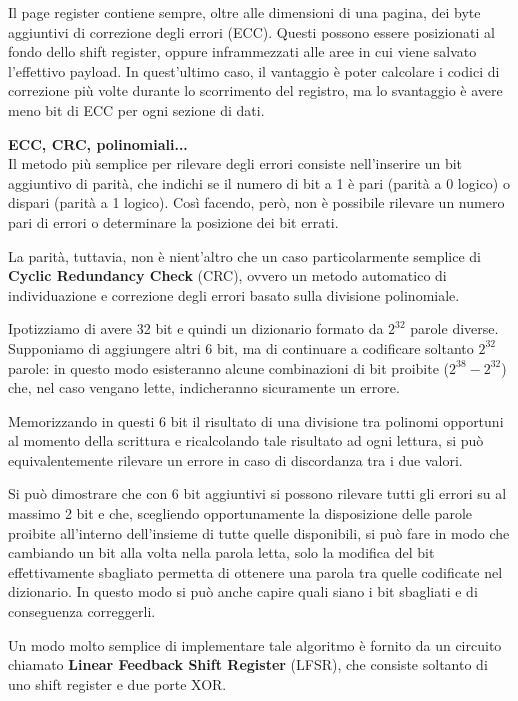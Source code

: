 \documentclass[11pt,4paper]{report}
\begin{document}
Il page register contiene sempre, oltre alle dimensioni di una pagina, dei byte aggiuntivi di correzione degli errori (ECC). Questi possono essere posizionati al fondo dello shift register, oppure inframmezzati alle aree in cui viene salvato l'effettivo payload. In quest'ultimo caso, il vantaggio è poter calcolare i codici di correzione più volte durante lo scorrimento del registro, ma lo svantaggio è avere meno bit di ECC per ogni sezione di dati.
\pagebreak
\begin{tcolorbox}[breakable]
\textbf{ECC, CRC, polinomiali...}\\
Il metodo più semplice per rilevare degli errori consiste nell'inserire un bit aggiuntivo di parità, che indichi se il numero di bit a 1 è pari (parità a 0 logico) o dispari (parità a 1 logico). Così facendo, però, non è possibile rilevare un numero pari di errori o determinare la posizione dei bit errati.

La parità, tuttavia, non è nient'altro che un caso particolarmente semplice di \textbf{Cyclic Redundancy Check} (CRC), ovvero un metodo automatico di individuazione e correzione degli errori basato sulla divisione polinomiale.

Ipotizziamo di avere 32 bit e quindi un dizionario formato da $2^{32}$ parole diverse. Supponiamo di aggiungere altri 6 bit, ma di continuare a codificare soltanto $2^{32}$ parole: in questo modo esisteranno alcune combinazioni di bit proibite ($2^{38}-2^{32}$) che, nel caso vengano lette, indicheranno sicuramente un errore. 

Memorizzando in questi 6 bit il risultato di una divisione tra polinomi opportuni al momento della scrittura e ricalcolando tale risultato ad ogni lettura, si può equivalentemente rilevare un errore in caso di discordanza tra i due valori.

Si può dimostrare che con 6 bit aggiuntivi si possono rilevare tutti gli errori su al massimo 2 bit e che, scegliendo opportunamente la disposizione delle parole proibite all'interno dell'insieme di tutte quelle disponibili, si può fare in modo che cambiando un bit alla volta nella parola letta, solo la modifica del bit effettivamente sbagliato permetta di ottenere una parola tra quelle codificate nel dizionario. In questo modo si può anche capire quali siano i bit sbagliati e di conseguenza correggerli.

Un modo molto semplice di implementare tale algoritmo è fornito da un circuito chiamato \textbf{Linear Feedback Shift Register} (LFSR), che consiste soltanto di uno shift register e due porte XOR.
\end{tcolorbox}
\end{document}
